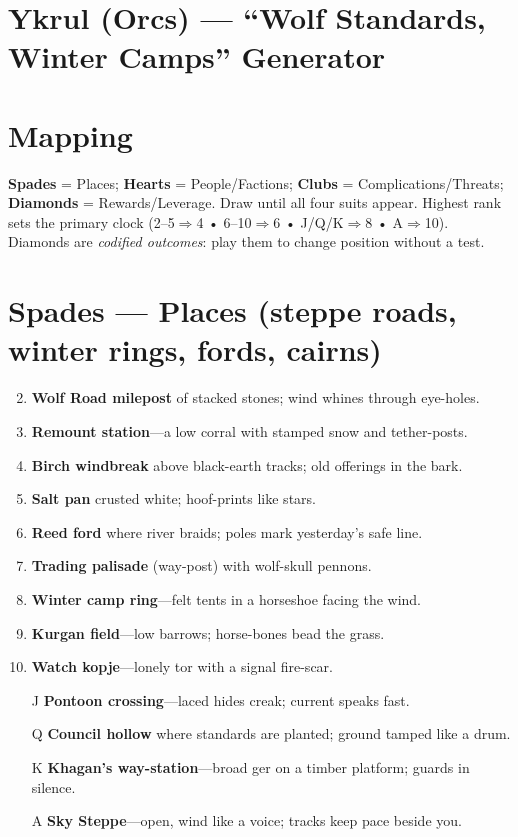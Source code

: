 \section{Ykrul (Orcs) --- ``Wolf Standards, Winter Camps'' Generator}

\section*{Mapping}
\textbf{Spades} = Places; \textbf{Hearts} = People/Factions; \textbf{Clubs} = Complications/Threats; \textbf{Diamonds} = Rewards/Leverage. Draw until all four suits appear. Highest rank sets the primary clock (2--5$\Rightarrow$4 • 6--10$\Rightarrow$6 • J/Q/K$\Rightarrow$8 • A$\Rightarrow$10). Diamonds are \emph{codified outcomes}: play them to change position without a test.

\section*{\textbf{Spades} --- Places (steppe roads, winter rings, fords, cairns)}
\begin{enumerate}
\setcounter{enumi}{1}
\item \textbf{Wolf Road milepost} of stacked stones; wind whines through eye-holes.
\item \textbf{Remount station}---a low corral with stamped snow and tether-posts.
\item \textbf{Birch windbreak} above black-earth tracks; old offerings in the bark.
\item \textbf{Salt pan} crusted white; hoof-prints like stars.
\item \textbf{Reed ford} where river braids; poles mark yesterday's safe line.
\item \textbf{Trading palisade} (way-post) with wolf-skull pennons.
\item \textbf{Winter camp ring}---felt tents in a horseshoe facing the wind.
\item \textbf{Kurgan field}---low barrows; horse-bones bead the grass.
\item \textbf{Watch kopje}---lonely tor with a signal fire-scar.
\item[J] \textbf{Pontoon crossing}---laced hides creak; current speaks fast.
\item[Q] \textbf{Council hollow} where standards are planted; ground tamped like a drum.
\item[K] \textbf{Khagan's way-station}---broad ger on a timber platform; guards in silence.
\item[A] \textbf{Sky Steppe}---open, wind like a voice; tracks keep pace beside you.
\end{enumerate}

